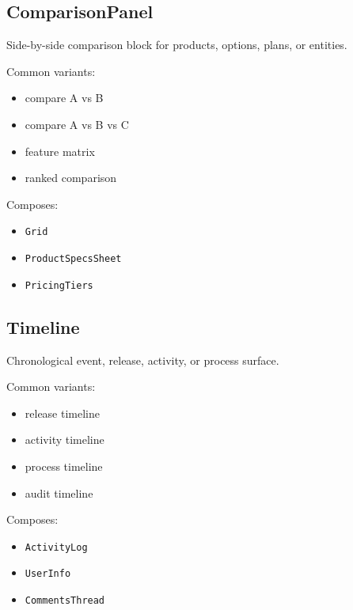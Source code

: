 \subsection{ComparisonPanel}\label{record-128-comparisonpanel}

Side-by-side comparison block for products, options, plans, or entities.

Common variants:

\begin{itemize}
\tightlist
\item
  compare A vs B
\item
  compare A vs B vs C
\item
  feature matrix
\item
  ranked comparison
\end{itemize}

Composes:

\begin{itemize}
\tightlist
\item
  \texttt{G\allowbreak{}r\allowbreak{}i\allowbreak{}d}
\item
  \texttt{P\allowbreak{}r\allowbreak{}o\allowbreak{}d\allowbreak{}u\allowbreak{}c\allowbreak{}t\allowbreak{}S\allowbreak{}p\allowbreak{}e\allowbreak{}c\allowbreak{}s\allowbreak{}S\allowbreak{}h\allowbreak{}e\allowbreak{}e\allowbreak{}t}
\item
  \texttt{P\allowbreak{}r\allowbreak{}i\allowbreak{}c\allowbreak{}i\allowbreak{}n\allowbreak{}g\allowbreak{}T\allowbreak{}i\allowbreak{}e\allowbreak{}r\allowbreak{}s}
\end{itemize}

\subsection{Timeline}\label{record-128-timeline}

Chronological event, release, activity, or process surface.

Common variants:

\begin{itemize}
\tightlist
\item
  release timeline
\item
  activity timeline
\item
  process timeline
\item
  audit timeline
\end{itemize}

Composes:

\begin{itemize}
\tightlist
\item
  \texttt{A\allowbreak{}c\allowbreak{}t\allowbreak{}i\allowbreak{}v\allowbreak{}i\allowbreak{}t\allowbreak{}y\allowbreak{}L\allowbreak{}o\allowbreak{}g}
\item
  \texttt{U\allowbreak{}s\allowbreak{}e\allowbreak{}r\allowbreak{}I\allowbreak{}n\allowbreak{}f\allowbreak{}o}
\item
  \texttt{C\allowbreak{}o\allowbreak{}m\allowbreak{}m\allowbreak{}e\allowbreak{}n\allowbreak{}t\allowbreak{}s\allowbreak{}T\allowbreak{}h\allowbreak{}r\allowbreak{}e\allowbreak{}a\allowbreak{}d}
\end{itemize}

